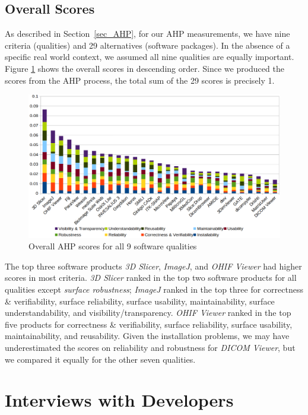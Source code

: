 \documentclass[final, 3p, times, authoryear]{elsarticle}
\begin{document}
\subsection{Overall Scores}

As described in Section~\ref{sec_AHP}, for our AHP measurements, we have nine
criteria (qualities) and 29 alternatives (software packages). In the absence of
a specific real world context, we assumed all nine qualities are equally
important. Figure \ref{fg_overall_scores} shows the overall scores in descending
order. Since we produced the scores from the AHP process, the total sum of the
29 scores is precisely 1.

\begin{figure}[ht]
\includegraphics[scale=0.38]{figures/overall_scores.png}
\caption{Overall AHP scores for all 9 software qualities}

\label{fg_overall_scores}
\end{figure}

The top three software products \textit{3D Slicer}, \textit{ImageJ}, and
\textit{OHIF Viewer} had higher scores in most criteria. \textit{3D Slicer}
ranked in the top two software products for all qualities except \textit{surface
robustness}; \textit{ImageJ} ranked in the top three for correctness \&
verifiability, surface reliability, surface usability, maintainability, surface
understandability, and visibility/transparency. \textit{OHIF Viewer} ranked in
the top five products for correctness \& verifiability, surface reliability,
surface usability, maintainability, and reusability. Given the installation
problems, we may have underestimated the scores on reliability and robustness
for \textit{DICOM Viewer}, but we compared it equally for the other seven
qualities.

\section{Interviews with Developers} \label{ch_interview}
\end{document}
